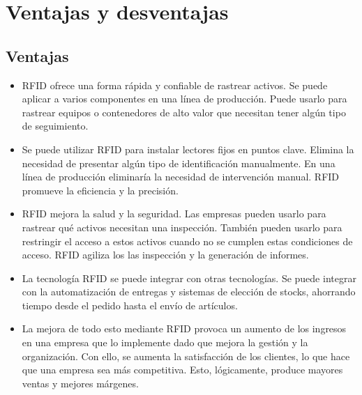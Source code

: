 \documentclass[12pt,a4paper,onecolumn,oneside]{report}
\begin{document}
\section{Ventajas y desventajas}
\label{Ventajas y desventajas}

\subsection{Ventajas}
\begin{itemize}
\item RFID ofrece una forma rápida y confiable de rastrear activos. Se puede aplicar a varios componentes en una línea de producción. Puede usarlo para rastrear equipos o contenedores de alto valor que necesitan tener algún tipo de seguimiento.
\item Se puede utilizar RFID para instalar lectores fijos en puntos clave. Elimina la necesidad de presentar algún tipo de identificación manualmente. En una línea de producción eliminaría la necesidad de intervención manual. RFID promueve la eficiencia y la precisión.
\item RFID mejora la salud y la seguridad. Las empresas pueden usarlo para rastrear qué activos necesitan una inspección. También pueden usarlo para restringir el acceso a estos activos cuando no se cumplen estas condiciones de acceso. RFID agiliza los las inspección y la generación de informes.
\item La tecnología RFID se puede integrar con otras tecnologías. Se puede integrar con la automatización de entregas y sistemas de elección de stocks, ahorrando tiempo desde el pedido hasta el envío de artículos.
\item La mejora de todo esto mediante RFID provoca un aumento de los ingresos en una empresa que lo implemente dado que mejora la gestión y la organización. Con ello, se aumenta la satisfacción de los clientes, lo que hace que una empresa sea más competitiva. Esto, lógicamente, produce mayores ventas y mejores márgenes.
\end{itemize}
\end{document}
